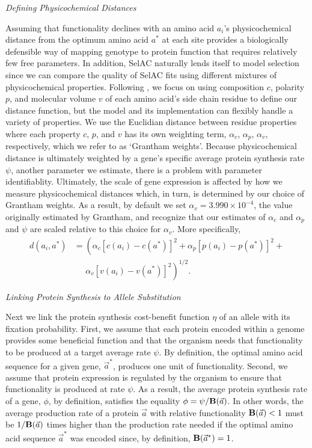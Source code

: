 \documentclass[12pt,letterpaper]{article}
\renewcommand{\subsection}[1]{%
\bigskip
\begin{center}
\begin{large}
\normalfont\itshape #1
\end{large}
\end{center}}
\newcommand{\Func}{\ensuremath{\text{\textbf{B}}}\xspace}
\newcommand{\selac}{SelAC\xspace}
\newcommand{\alphac}{\ensuremath{\alpha_c}\xspace}
\newcommand{\alphap}{\ensuremath{\alpha_p}\xspace}
\newcommand{\alphav}{\ensuremath{\alpha_v}\xspace}
\newcommand{\aopt}{\ensuremath{a^*}\xspace}
\newcommand{\aoptvec}{\ensuremath{\Vec{a}^*}\xspace}
\newcommand{\avec}{\ensuremath{\Vec{a}}\xspace}
\begin{document}
\subsection{Defining Physicochemical Distances}
Assuming that functionality declines with an amino acid $a_i$'s physicochemical distance from the optimum amino acid \aopt at each site provides a biologically defensible way of mapping genotype to protein function that requires relatively few free parameters.
In addition, \selac naturally lends itself to model selection since we can compare the quality of \selac fits using different mixtures of physicochemical properties.
Following \cite{Grantham1974}, we focus on using composition $c$, polarity $p$, and molecular volume $v$ of each amino acid's side chain residue to define our distance function, but the model and its implementation can flexibly handle a variety of properties.
We use the Euclidian distance between residue properties where each property $c$, $p$, and $v$ has its own weighting term, $\alphac$, $\alphap$, $\alphav$, respectively, which we refer to as `Grantham weights'.
Because physicochemical distance is ultimately weighted by a gene's specific average protein synthesis rate $\psi$, another parameter we estimate, there is a problem with parameter identifiablity.
Ultimately, the scale of gene expression is affected by how we measure physicochemical distances which, in turn, is determined by our choice of Grantham weights.
As a result, by default we set $\alphav = 3.990 \times 10^{-4}$, the value originally estimated by Grantham, and recognize that our estimates of $\alphac$ and $\alphap$ and $\psi$ are scaled relative to this choice for $\alphav$.
More specifically,
\begin{align*}
  d(a_i, \aopt) &= \left(\alphac \left[c\left(a_i\right) - c\left(\aopt\right)\right]^2 + \alphap \left[p\left(a_i\right) - p\left(\aopt\right)\right]^2 + \right.\\
  & \;\;\;\;\;\left. \alphav \left[v\left(a_i\right) - v\left(\aopt\right)\right]^2\right)^{1/2}.
\end{align*}


\subsection{Linking Protein Synthesis to Allele Substitution}
Next we link the protein synthesis cost-benefit function $\eta$ of an allele with its fixation probability.
First, we assume that each protein encoded within a genome provides some beneficial function and that the organism needs that functionality to be produced at a target average rate $\psi$.
By definition, the optimal amino acid sequence for a given gene, \aoptvec, produces one unit of functionality.
Second, we assume that protein expression is regulated by the organism to ensure that functionality is produced at rate $\psi$.
As a result, the average protein synthesis rate of a gene, $\phi$, by definition, satisfies the equality  $\phi = \psi/\Func(\avec)$.
In other words, the average production rate of a protein \avec with relative functionality $\Func(\avec) < 1$ must be $1/\Func(\avec)$ times higher than the production rate needed if the optimal amino acid sequence \aoptvec was encoded since, by definition, $\Func(\aoptvec) = 1$.
\end{document}
